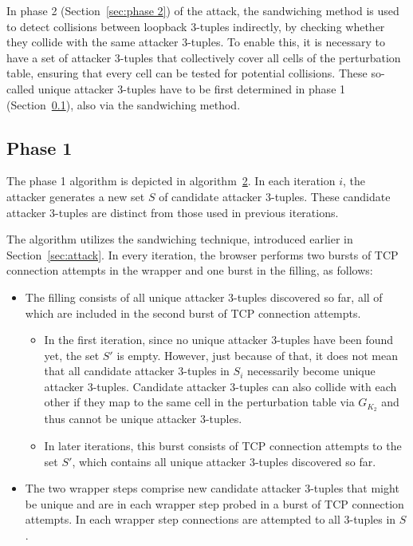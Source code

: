\documentclass[twocolumn]{report}
\begin{document}
In phase 2 (Section~\ref{sec:phase 2}) of the attack, the sandwiching method is used to detect collisions between loopback 3-tuples indirectly, by checking whether they collide with the same attacker 3-tuples. To enable this, it is necessary to have a set of attacker 3-tuples that collectively cover all cells of the perturbation table, ensuring that every cell can be tested for potential collisions. These so-called \alert{unique attacker 3-tuples} have to be first determined in phase 1 (Section~\ref{sec:phase 1}), also via the sandwiching method.

\subsection{Phase 1}
\label{sec:phase 1}

The phase 1 algorithm is depicted in algorithm~\hyperref[alg:phase1]{2}. In each iteration $i$, the attacker generates a new set $S$ of \alert{candidate attacker 3-tuples}. These candidate attacker 3-tuples are distinct from those used in previous iterations.

The algorithm utilizes the \alert{sandwiching technique}, introduced earlier in Section~\ref{sec:attack}. In every iteration, the browser performs two bursts of TCP connection attempts in the wrapper and one burst in the filling, as follows:
\begin{itemize}
	\item The \alert{filling} consists of all \alert{unique attacker 3-tuples} discovered so far, all of which are included in the second burst of TCP connection attempts.
	\begin{itemize}
    \item In the first iteration, since no unique attacker 3-tuples have been found yet, the set $S'$ is \alert{empty}. However, just because of that, it does not mean that all candidate attacker 3-tuples in $S_i$ necessarily become unique attacker 3-tuples. Candidate attacker 3-tuples \alert{can} also \alert{collide with each other} if they map to the same cell in the perturbation table via $G_{K_2}$ and thus cannot be unique attacker 3-tuples.
		\item In later iterations, this burst consists of TCP connection attempts to the set $S'$, which contains \alert{all unique attacker 3-tuples discovered so far}.
	\end{itemize}
	\item The two \alert{wrapper} steps comprise new candidate attacker 3-tuples that might be unique and are in each wrapper step probed in a burst of TCP connection attempts. In each wrapper step connections are attempted to all 3-tuples in $S$.
\end{itemize}
\end{document}
